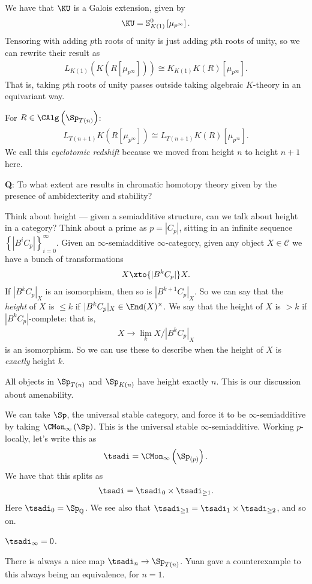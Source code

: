 We have that $\KU$ is a Galois extension, given by
\begin{align*}
    \KU = \mathbb{S}^0_{K(1)} \left[ \mu_{p^\infty} \right].
\end{align*}
Tensoring with adding $p$th roots of unity is just adding $p$th roots of unity, so we can rewrite their result as
\begin{align*}
     L_{K(1)} \left( K \left( R \left[ \mu_{p^\infty} \right] \right) \right) \cong K_{K(1)} K(R) \left[ \mu_{p^\infty} \right].
\end{align*}
That is, taking $p$th roots of unity passes outside taking algebraic $K$-theory in an equivariant way.

For $R\in \CAlg \left( \Sp_{T(n)} \right)$:
\begin{align*}
    L_{T(n+1)} K \left( R \left[ \mu_{p^\infty} \right] \right) \cong L_{T(n+1)} K(R) \left[ \mu_{p^\infty} \right].
\end{align*}
We call this \textit{cyclotomic redshift} because we moved from height $n$ to height $n+1$ here.

\textbf{Q}: To what extent are results in chromatic homotopy theory given by the presence of ambidexterity and stability?

Think about height --- given a semiadditive structure, can we talk about height in a category? Think about a prime as $p = |C_p|$, sitting in an infinite sequence $\left\{ |B^iC_p| \right\}_{i=0}^\infty$. Given an $\infty$-semiadditive $\infty$-category, given any object $X\in \mathscr{C}$ we have a bunch of transformations
\begin{align*}
    X \xto{|B^kC_p|} X.
\end{align*}
If $|B^kC_p|_X$ is an isomorphism, then so is $|B^{k+1}C_p|_X$. So we can say that the \textit{height} of $X$ is $\le k$ if $|B^kC_p|_X \in \End(X)^\times$. We say that the height of $X$ is $> k$ if $|B^kC_p|$-complete: that is,
\begin{align*}
    X \to \lim_k X / |B^k C_p|_X
\end{align*}
is an isomorphism. So we can use these to describe when the height of $X$ is \textit{exactly} height $k$.

All objects in $\Sp_{T(n)}$ and $\Sp_{K(n)}$ have height exactly $n$. This is our discussion about amenability.

We can take $\Sp$, the universal stable category, and force it to be $\infty$-semiadditive by taking $\CMon_\infty \left( \Sp \right)$. This is the universal stable $\infty$-semiadditive. Working $p$-locally, let's write this as
\begin{align*}
    \tsadi = \CMon_\infty \left( \Sp_{(p)} \right).
\end{align*}
We have that this splits as
\begin{align*}
    \tsadi = \tsadi_0 \times\tsadi_{\ge 1}.
\end{align*}
Here $\tsadi_0 = \Sp_\mathbb{Q}$. We see also that $\tsadi_{\ge 1} = \tsadi_1 \times \tsadi_{\ge 2}$, and so on.

\begin{conjecture} $\tsadi_\infty = 0$.
\end{conjecture}

There is always a nice map $\tsadi_n \to \Sp_{T(n)}$. Yuan gave a counterexample to this always being an equivalence, for $n=1$.
